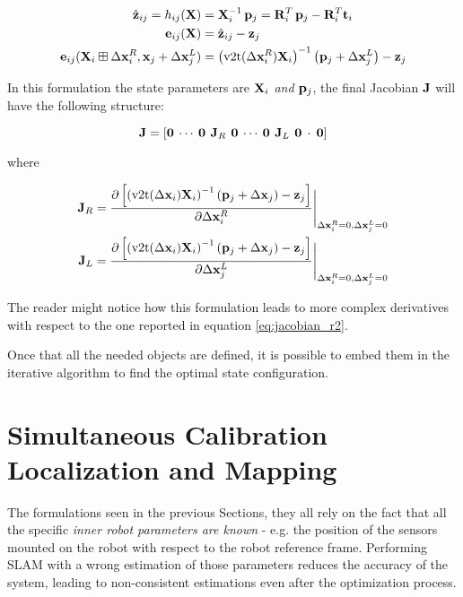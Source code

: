 \begin{align*}
    \pred_{ij} = h_{ij}(\SState) &= \SState_i^{-1} \, \p_j = \rot_{i}^T\,\p_j - \rot_{i}^T\trans_i \\
    \error_{ij}(\SState) &= \pred_{ij} - \meas_j \\
    \error_{ij}(\SState_i \boxplus \dx_i^R, \state_j + \dx_j^L) &= \left(\v2t(\dx_i^R)\SState_i\right)^{-1}\left(\p_j + \dx_j^L\right) - \meas_j
\end{align*}

In this formulation the state parameters are $\mathbf{X}_i$ \textit{and} $\mathbf{p}_j$, the final Jacobian $\mathbf{J}$ will have the following structure:

\begin{equation*}
    \mathbf{J} = \left[\mathbf{0} \: \cdots \: \mathbf{0} \:\, \mathbf{J}_R \,\: \mathbf{0} \: \cdots \: \mathbf{0} \:\, \mathbf{J}_L \,\: \mathbf{0} \: \cdot \: \mathbf{0}\right]
\end{equation*}

\noindent where 

\begin{align}
    \label{eq:jac_p_se2}
    \jacob_R &= \frac{\partial \left[\left(\v2t(\dx_i)\SState_i\right)^{-1}\left(\p_j + \dx_j\right) - \meas_j\right]}{\partial\dx_i^R}\Bigg \rvert_{\dx_i^R = 0, \dx_j^L = 0} \\
    \label{eq:jac_l_se2}
    \jacob_L &= \frac{\partial \left[\left(\v2t(\dx_i)\SState_i\right)^{-1}\left(\p_j + \dx_j\right) - \meas_j\right]}{\partial\dx_j^L}\Bigg \rvert_{\dx_i^R = 0, \dx_j^L = 0}
\end{align}

\noindent The reader might notice how this formulation leads to more complex derivatives with respect to the one reported in equation \ref{eq:jacobian_r2}.

\vspace{10px}

Once that all the needed objects are defined, it is possible to embed them in the iterative algorithm to find the optimal state configuration.

\section{Simultaneous Calibration Localization and Mapping}
The formulations seen in the previous Sections, they all rely on the fact that all the specific \textit{inner robot parameters are known} - e.g. the position of the sensors mounted on the robot with respect to the robot reference frame. Performing SLAM with a wrong estimation of those parameters reduces the accuracy of the system, leading to non-consistent estimations even after the optimization process.

